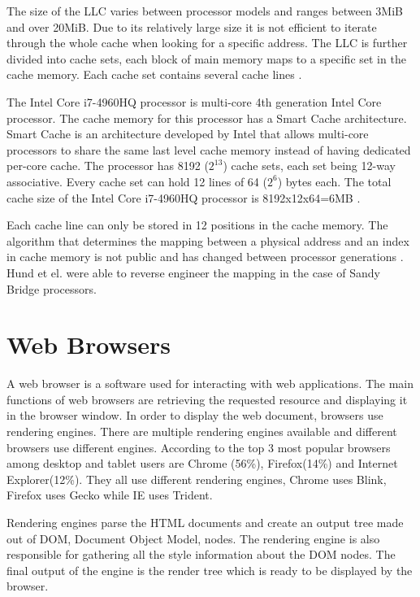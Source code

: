 \documentclass[10pt,a4paper,twoside]{book}
\begin{document}
The size of the LLC varies between processor models and ranges between 3MiB and over 20MiB. Due to its relatively large size it is not efficient to iterate through the whole cache when looking for a specific address. The LLC is further divided into cache sets, each block of main memory maps to a specific set in the cache memory. Each cache set contains several cache lines \cite{oren2015spy}. 

The Intel Core i7-4960HQ processor is multi-core 4th generation Intel Core processor. The cache memory for this processor has a Smart Cache architecture. Smart Cache is an architecture developed by Intel that allows multi-core processors to share the same last level cache memory instead of having dedicated per-core cache. The processor has 8192 ($2^{13}$) cache sets, each set being 12-way associative. Every cache set can hold 12 lines of  64 ($2^6$) bytes each. The total cache size of the Intel Core i7-4960HQ processor is 8192x12x64=6MB \cite{oren2015spy}.

Each cache line can only be stored in 12 positions in the cache memory. The algorithm that determines the mapping between a physical address and an index in cache memory is not public and has changed between processor generations \cite{oren2015spy}. Hund et el. \cite{hund2013practical} were able to reverse engineer the mapping in the case of Sandy Bridge processors.

\section{Web Browsers}

A web browser is a software used for interacting with web applications. The main functions of web browsers are retrieving the requested resource and displaying it in the browser window. In order to display the web document, browsers use rendering engines. There are multiple rendering engines available and different browsers use different engines. According to \cite{statcounter} the top 3 most popular browsers among desktop and tablet users are Chrome (56\%), Firefox(14\%) and Internet Explorer(12\%). They all use different rendering engines, Chrome uses Blink, Firefox uses Gecko while IE uses Trident\cite{howbrowserswork}.

Rendering engines parse the HTML documents and create an output tree made out of DOM, Document Object Model, nodes. The rendering engine is also responsible for gathering all the style information about the DOM nodes. The final output of the engine is the render tree which is ready to be displayed by the browser\cite{howbrowserswork}.
\end{document}
